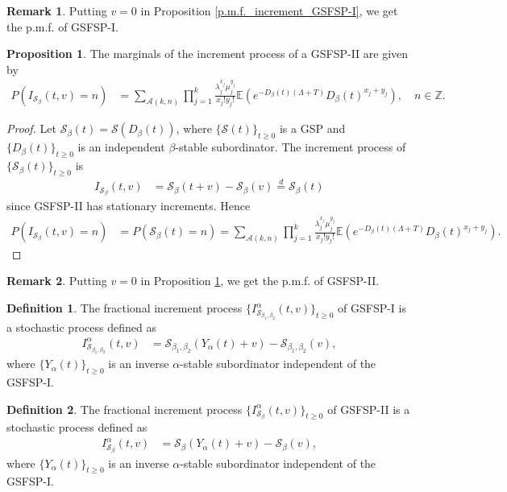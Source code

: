 \documentclass[11pt,oneside,reqno]{amsart}
\theoremstyle{definition}
\newtheorem{remark}{\bf Remark}[section]
\newtheorem{proposition}{Proposition}[section]
\newtheorem{definition}{Definition}[section]
\theoremstyle{remarkstyle}
\begin{document}
 \begin{remark}
Putting $v=0$ in Proposition \ref{p.m.f._increment_GSFSP-I}, we get the p.m.f. of GSFSP-I.
 \end{remark}
\begin{proposition}\label{p.m.f._increment_GSFSP-II}
    The marginals of the increment process of a GSFSP-II are given by
    \begin{align*}
    P(I_{\mathcal{S}_{\beta}}(t,v)=n)&=\sum_{\mathcal{A}(k,n)}\prod_{j=1}^{k}\frac{\lambda_j^{x_j}\mu_j^{y_j}}{x_j!y_j!}\mathbb{E}(e^{-D_\beta(t)(\Lambda+T)}D_\beta(t)^{x_j+y_j}),\quad n\in\mathbb{Z}.
\end{align*}
\end{proposition}
\begin{proof}
Let $\mathcal{S}_{\beta}(t)=\mathcal{S}(D_\beta(t))$, where $\{\mathcal{S}(t)\}_{t\ge 0}$ is a GSP and $\{D_\beta(t)\}_{t\ge 0}$ is an independent $\beta$-stable subordinator. The increment process of $\{\mathcal{S}_{\beta}(t)\}_{t\ge 0}$ is
\begin{align*}
I_{\mathcal{S}_{\beta}}(t,v)&=\mathcal{S}_\beta(t+v)-\mathcal{S}_\beta(v)\overset{d}{=}\mathcal{S}_{\beta}(t)
\end{align*}
since GSFSP-II has stationary increments. Hence 
\begin{align} 
    P(I_{\mathcal{S}_{\beta}}(t,v)=n)
    &=P(\mathcal{S}_{\beta}(t)=n)=\sum_{\mathcal{A}(k,n)}\prod_{j=1}^{k}\frac{\lambda_j^{x_j}\mu_j^{y_j}}{x_j!y_j!}\mathbb{E}(e^{-D_\beta(t)(\Lambda+T)}D_\beta(t)^{x_j+y_j}).\label{incrementGSTFSP-II}
 \end{align}
\end{proof}
\begin{remark}
Putting $v=0$ in Proposition \ref{p.m.f._increment_GSFSP-II}, we get the p.m.f. of GSFSP-II.
 \end{remark}
 
\begin{definition}
 The fractional increment process $\{I_{\mathcal{S}_{\beta_1,\beta_2}}^\alpha(t,v)\}_{t\geq 0}$ of GSFSP-I is a stochastic process defined as
\begin{align*}
I_{\mathcal{S}_{\beta_1,\beta_2}}^\alpha(t,v)&=\mathcal{S}_{\beta_1,\beta_2}(Y_\alpha(t)+v)-\mathcal{S}_{\beta_1,\beta_2}(v),
\end{align*}
where $\{Y_\alpha(t)\}_{t\geq 0}$ is an inverse $\alpha$-stable subordinator independent of the GSFSP-I.
\end{definition}
\begin{definition}\label{definition_fractional_increment_GSFSP-II}
 The fractional increment process $\{I_{\mathcal{S}_{\beta}}^\alpha(t,v)\}_{t\geq 0}$ of GSFSP-II is a stochastic process defined as
\begin{align*}
I_{\mathcal{S}_{\beta}}^\alpha(t,v)&=\mathcal{S}_{\beta}(Y_\alpha(t)+v)-\mathcal{S}_{\beta}(v),
\end{align*}
where $\{Y_\alpha(t)\}_{t\geq 0}$ is an inverse $\alpha$-stable subordinator independent of the GSFSP-I.
\end{definition}
\end{document}
